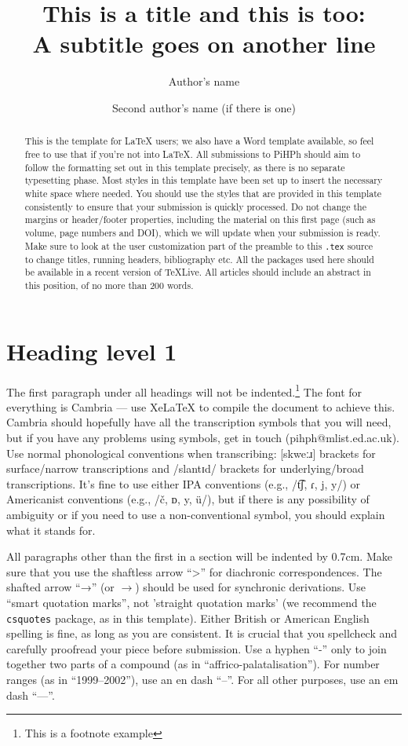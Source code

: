 \documentclass[article, a4paper, 12pt]{memoir}
\date{}
\title{This is a title and this is too:\\A subtitle goes on another line}
\author{Author's name\\\affiliation{Author's affiliation} \and Second author's name (if there is one)\\\affiliation{Second author's affiliation}}
\begin{document}
\setcounter{page}{1}
\maketitle


\begin{abstract}
\noindent This is the template for \LaTeX{} users; we also have a Word template available, so feel free to use that if you're not into \LaTeX. All submissions to PiHPh should aim to follow the formatting set out in this template precisely, as there is no separate typesetting phase. Most styles in this template have been set up to insert the necessary white space where needed. You should use the styles that are provided in this template consistently to ensure that your submission is quickly processed. Do not change the margins or header/footer properties, including the material on this first page (such as volume, page numbers and DOI), which we will update when your submission is ready. Make sure to look at the user customization part of the preamble to this \texttt{.tex} source to change titles, running headers, bibliography etc. All the packages used here should be available in a recent version of \TeX Live. All articles should include an abstract in this position, of no more than 200 words. 
\end{abstract}

\section{Heading level 1}
\label{sec:heading-level-1}

The first paragraph under all headings will not be indented.\footnote{This is a footnote example}  The font for everything is Cambria --- use Xe\LaTeX{} to compile the document to achieve this. Cambria should hopefully have all the transcription symbols that you will need, but if you have any problems using symbols, get in touch (pihph@\hspace{0pt}mlist.ed.ac.uk). Use normal phonological conventions when transcribing: [skweːɹ] brackets for surface/narrow transcriptions and /slantɪd/ brackets for underlying/broad transcriptions. It’s fine to use either IPA conventions (e.g., /t͡ʃ, ɾ, j, y/) or Americanist conventions (e.g., /č, ᴅ, y, ü/), but if there is any possibility of ambiguity or if you need to use a non-conventional symbol, you should explain what it stands for. 

All paragraphs other than the first in a section will be indented by 0.7cm. Make sure that you use the shaftless arrow \enquote{>} for diachronic correspondences. The shafted arrow \enquote{→} (or $\rightarrow$) should be used for synchronic derivations. Use \enquote{smart quotation marks}, not {'straight quotation marks'} (we recommend the \texttt{csquotes} package, as in this template). Either British or American English spelling is fine, as long as you are consistent. It is crucial that you spellcheck and carefully proofread your piece before submission. Use a hyphen \enquote{-} only to join together two parts of a compound (as in \enquote{affrico-palatalisation}). For number ranges (as in \enquote{1999–2002}), use an en dash \enquote{--}. For all other purposes, use an em dash \enquote{---}.
\end{document}
